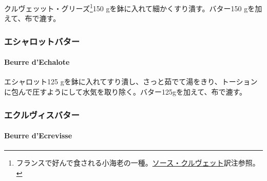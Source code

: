 \begin{recette}

クルヴェッット・グリーズ\footnote{フランスで好んで食される小海老の一種。\protect\hyperlink{sauce-aux-crevettes}{ソース・クルヴェット}訳注参照。}150
gを鉢に入れて細かくすり潰す。バター150 gを加えて、布で漉す。

\maeaki

\hypertarget{ux30a8ux30b7ux30e3ux30edux30c3ux30c8ux30d0ux30bfux30fc}{%
\subsubsection{エシャロットバター}\label{ux30a8ux30b7ux30e3ux30edux30c3ux30c8ux30d0ux30bfux30fc}}

\hypertarget{beurre-d-echalote}{%
\paragraph{Beurre d'Echalote}\label{beurre-d-echalote}}


エシャロット125
gを鉢に入れてすり潰し、さっと茹でて湯をきり、トーションに包んで圧すようにして水気を取り除く。バター125gを加えて、布で漉す。

\maeaki

\hypertarget{ux30a8ux30afux30ebux30f4ux30a3ux30b9ux30d0ux30bfux30fc}{%
\subsubsection{エクルヴィスバター}\label{ux30a8ux30afux30ebux30f4ux30a3ux30b9ux30d0ux30bfux30fc}}

\hypertarget{beurre-d-ecrevisse}{%
\paragraph{Beurre d'Ecrevisse}\label{beurre-d-ecrevisse}}


\end{recette}
